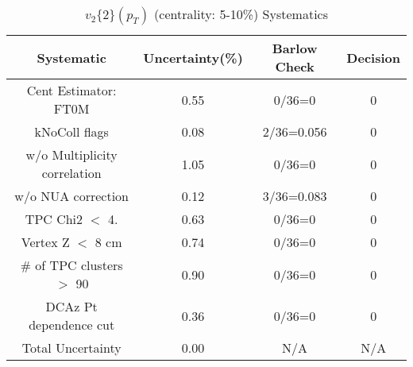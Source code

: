 \begin{table}[htbp]
\caption{$v_2\{2\}(p_{T})$ (centrality: 5-10\%) Systematics}
\label{tab:Sys_pTDiffv2}
\centering
\begin{tabular}{|c|c|c|c|}
\hline
Systematic & Uncertainty(\%) & Barlow Check & Decision \\
\hline
Cent Estimator: FT0M & 0.55 & 0/36=0 & 0 \\
kNoColl flags & 0.08 & 2/36=0.056 & 0 \\
w/o Multiplicity correlation & 1.05 & 0/36=0 & 0 \\
w/o NUA correction & 0.12 & 3/36=0.083 & 0 \\
TPC Chi2 $<$ 4. & 0.63 & 0/36=0 & 0 \\
Vertex Z $<$ 8 cm & 0.74 & 0/36=0 & 0 \\
\# of TPC clusters $>$ 90 & 0.90 & 0/36=0 & 0 \\
DCAz Pt dependence cut & 0.36 & 0/36=0 & 0 \\
\hline
Total Uncertainty & 0.00 & N/A & N/A \\
\hline
\end{tabular}
\end{table}
